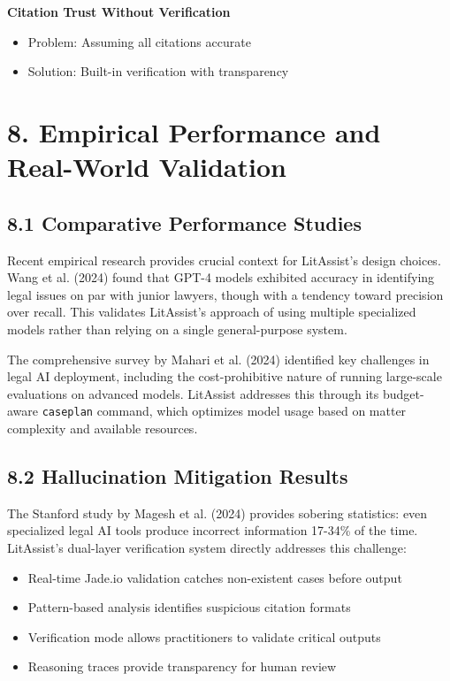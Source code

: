 \documentclass[12pt,a4paper]{article}
\begin{document}
\textbf{Citation Trust Without Verification}
\begin{itemize}
\item Problem: Assuming all citations accurate
\item Solution: Built-in verification with transparency
\end{itemize}

\section*{8. Empirical Performance and Real-World Validation}

\subsection*{8.1 Comparative Performance Studies}

Recent empirical research provides crucial context for LitAssist's design choices. Wang et al. (2024) found that GPT-4 models exhibited accuracy in identifying legal issues on par with junior lawyers, though with a tendency toward precision over recall. This validates LitAssist's approach of using multiple specialized models rather than relying on a single general-purpose system.

The comprehensive survey by Mahari et al. (2024) identified key challenges in legal AI deployment, including the cost-prohibitive nature of running large-scale evaluations on advanced models. LitAssist addresses this through its budget-aware \texttt{caseplan} command, which optimizes model usage based on matter complexity and available resources.

\subsection*{8.2 Hallucination Mitigation Results}

The Stanford study by Magesh et al. (2024) provides sobering statistics: even specialized legal AI tools produce incorrect information 17-34\% of the time. LitAssist's dual-layer verification system directly addresses this challenge:

\begin{itemize}
\item Real-time Jade.io validation catches non-existent cases before output
\item Pattern-based analysis identifies suspicious citation formats
\item Verification mode allows practitioners to validate critical outputs
\item Reasoning traces provide transparency for human review
\end{itemize}
\end{document}
